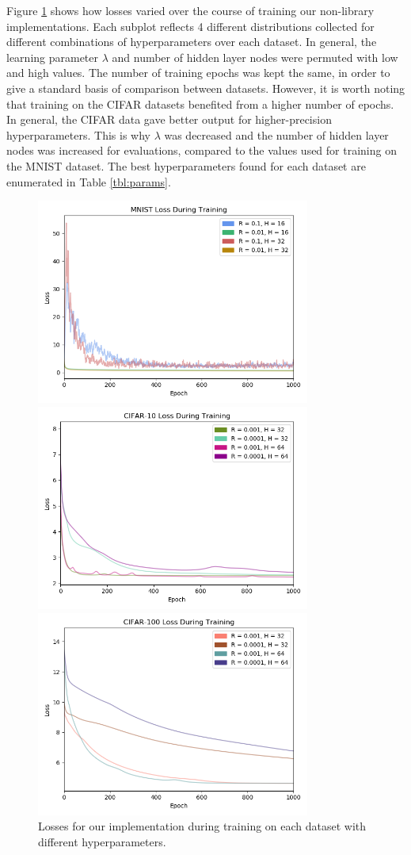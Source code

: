 \documentclass[letterpaper]{article} %
\begin{document}
Figure \ref{fig:losses} shows how losses varied over the course of training our non-library implementations.
Each subplot reflects 4 different distributions collected for different combinations of hyperparameters over each dataset.
In general, the learning parameter $\lambda$ and number of hidden layer nodes were permuted with
low and high values. The number of training epochs was kept the same, in order to give a standard basis of comparison
between datasets. However, it is worth noting that training on the CIFAR datasets benefited from a higher number of
epochs. In general, the CIFAR data gave better output for higher-precision hyperparameters. This is why $\lambda$
was decreased and the number of hidden layer nodes was increased for evaluations,
compared to the values used for training on the MNIST dataset.
The best hyperparameters found for each dataset are enumerated in Table \ref{tbl:params}.

\begin{figure}[htbp]
\centerline{\includegraphics[width=9cm]{mnist_loss.png}}
\centerline{\includegraphics[width=9cm]{cifar-10_loss.png}}
\centerline{\includegraphics[width=9cm]{cifar-100_loss.png}}
\caption{Losses for our implementation during training on each dataset with different hyperparameters.}
\label{fig:losses}
\end{figure}
\end{document}

